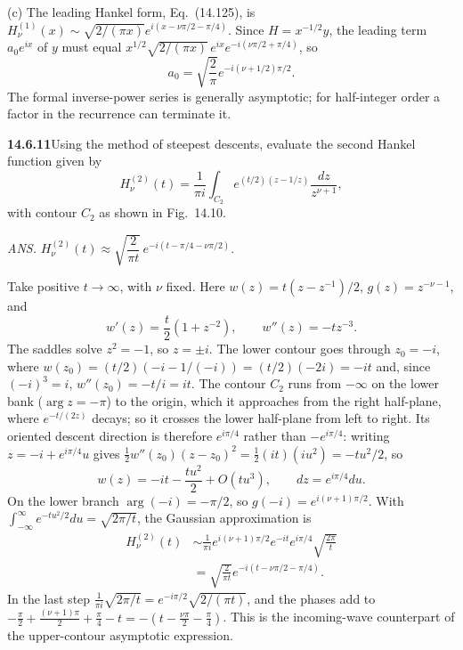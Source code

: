 (c) The leading Hankel form, Eq.~(14.125), is
$H_\nu^{(1)}(x)\sim\sqrt{2/(\pi x)}
e^{i(x-\nu\pi/2-\pi/4)}$. Since $H=x^{-1/2}y$, the leading term
$a_0e^{ix}$ of $y$ must equal
$x^{1/2}\sqrt{2/(\pi x)}\,e^{ix}e^{-i(\nu\pi/2+\pi/4)}$, so
\[
\boxed{a_0=\sqrt{\frac2\pi}
e^{-i(\nu+1/2)\pi/2}}.
\]
The formal inverse-power series is generally asymptotic; for
half-integer order a factor in the recurrence can terminate it.

\par\bigskip
\noindent\textbf{14.6.11}\quad Using the method of steepest descents,
evaluate the second Hankel function given by
\[
H_{\nu}^{(2)}(t)=\frac{1}{\pi i}\int_{C_{2}}
e^{(t/2)(z-1/z)}\frac{dz}{z^{\nu+1}},
\]
with contour $C_{2}$ as shown in Fig.~14.10.
\par\nobreak\hfill\emph{ANS.}\enspace
$H_{\nu}^{(2)}(t)\approx\sqrt{\dfrac{2}{\pi t}}\,
e^{-i(t-\pi/4-\nu\pi/2)}$.
\par{}
\solution
Take positive $t\to\infty$, with $\nu$ fixed. Here
$w(z)=t(z-z^{-1})/2$, $g(z)=z^{-\nu-1}$, and
\[
w'(z)=\frac t2(1+z^{-2}),\qquad w''(z)=-tz^{-3}.
\]
The saddles solve $z^2=-1$, so $z=\pm i$.
The lower contour goes through $z_0=-i$, where
$w(z_0)=(t/2)(-i-1/(-i))=(t/2)(-2i)=-it$ and, since $(-i)^3=i$,
$w''(z_0)=-t/i=it$. The contour $C_2$ runs from $-\infty$ on the
lower bank ($\arg z=-\pi$) to the origin, which it approaches from
the right half-plane, where $e^{-t/(2z)}$ decays; so it crosses the
lower half-plane from left to right. Its oriented descent direction
is therefore $e^{i\pi/4}$ rather than $-e^{i\pi/4}$: writing
$z=-i+e^{i\pi/4}u$ gives
$\frac12w''(z_0)(z-z_0)^2=\frac12(it)(iu^2)=-tu^2/2$, so
\[
w(z)=-it-\frac{tu^2}{2}+O(tu^3),\qquad
dz=e^{i\pi/4}du.
\]
On the lower branch $\arg(-i)=-\pi/2$, so
$g(-i)=e^{i(\nu+1)\pi/2}$. With
$\int_{-\infty}^\infty e^{-tu^2/2}du=\sqrt{2\pi/t}$, the Gaussian
approximation is
\begin{align*}
H_\nu^{(2)}(t)
&\sim\frac1{\pi i}e^{i(\nu+1)\pi/2}e^{-it}
e^{i\pi/4}\sqrt{\frac{2\pi}{t}}\\
&=\boxed{\sqrt{\frac2{\pi t}}
e^{-i(t-\nu\pi/2-\pi/4)}}.
\end{align*}
In the last step
$\frac1{\pi i}\sqrt{2\pi/t}=e^{-i\pi/2}\sqrt{2/(\pi t)}$,
and the phases add to
$-\frac\pi2+\frac{(\nu+1)\pi}2+\frac\pi4-t=-(t-\frac{\nu\pi}2-\frac\pi4)$.
This is the incoming-wave counterpart of the
upper-contour asymptotic expression.

